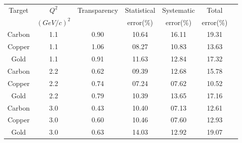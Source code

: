\begin{center}
\begin{tabular}{||c|c|c|c|c|c|c||}\hline
 Target & $Q^2$ & Transparency & Statistical & Systematic & Total \\
 & $(GeV/c)^2$ & & error($\%$)& error($\%$)&error($\%$) \\\hline
Carbon & 1.1 & 0.90 &10.64 &16.11 &19.31\\
Copper & 1.1 & 1.06 &08.27 &10.83 &13.63\\
Gold   & 1.1 & 0.91 &11.63 &12.84 &17.32\\\hline
Carbon & 2.2 & 0.62 &09.39 &12.68 &15.78\\
Copper & 2.2 & 0.74 &07.24 &07.62 &10.52\\
Gold   & 2.2 & 0.79 &10.39 &13.65 &17.16\\\hline
Carbon & 3.0 & 0.43 &10.40 &07.13 &12.61\\
Copper & 3.0 & 0.60 &10.46 &07.60 &12.93\\
Gold   & 3.0 & 0.63 &14.03 &12.92 &19.07\\\hline
\end{tabular}
\end{center}